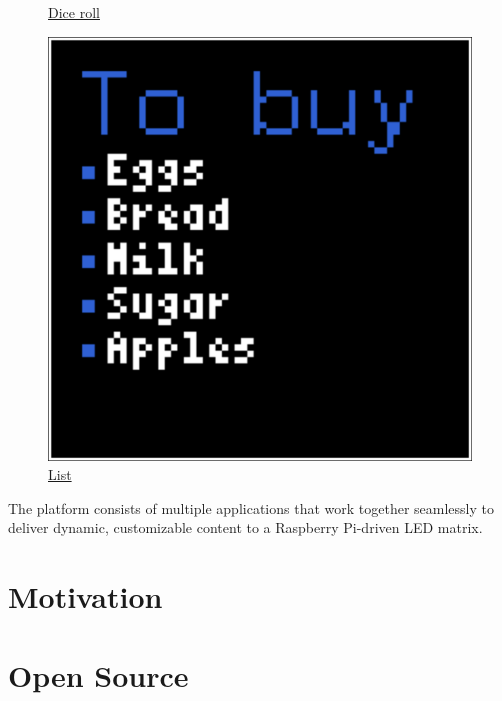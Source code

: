 \begin{figure}[h]
\begin{minipage}[b]{0.24\textwidth}
        \caption*{\href{https://github.com/mosaico-widgets/d6}{Dice roll} }
    \end{minipage}
    \begin{minipage}[b]{0.24\textwidth}
        \centering
        \includegraphics[width=\textwidth]{tesi/img/stylized_widgets/lists.png}
        \caption*{\href{https://github.com/mosaico-widgets/list}{List} }
    \end{minipage}
\end{figure}

The platform consists of multiple applications that work together seamlessly to deliver dynamic, customizable content to a Raspberry Pi-driven LED matrix.

\section{Motivation}


\section{Open Source}
